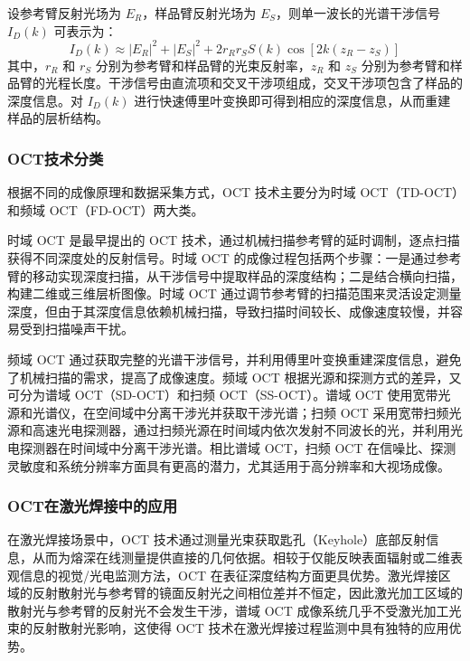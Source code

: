 设参考臂反射光场为 $E_R$，样品臂反射光场为 $E_S$，则单一波长的光谱干涉信号 $I_D(k)$ 可表示为：
\begin{equation}
I_D(k) \approx |E_R|^2 + |E_S|^2 + 2r_R r_S S(k) \cos[2k(z_R - z_S)]
\label{eq:oct_interference}
\end{equation}
其中，$r_R$ 和 $r_S$ 分别为参考臂和样品臂的光束反射率，$z_R$ 和 $z_S$ 分别为参考臂和样品臂的光程长度。干涉信号由直流项和交叉干涉项组成，交叉干涉项包含了样品的深度信息。对 $I_D(k)$ 进行快速傅里叶变换即可得到相应的深度信息，从而重建样品的层析结构。

\subsubsection{OCT技术分类}

根据不同的成像原理和数据采集方式，OCT 技术主要分为时域 OCT（TD-OCT）和频域 OCT（FD-OCT）两大类。

时域 OCT 是最早提出的 OCT 技术，通过机械扫描参考臂的延时调制，逐点扫描获得不同深度处的反射信号。时域 OCT 的成像过程包括两个步骤：一是通过参考臂的移动实现深度扫描，从干涉信号中提取样品的深度结构；二是结合横向扫描，构建二维或三维层析图像。时域 OCT 通过调节参考臂的扫描范围来灵活设定测量深度，但由于其深度信息依赖机械扫描，导致扫描时间较长、成像速度较慢，并容易受到扫描噪声干扰。

频域 OCT 通过获取完整的光谱干涉信号，并利用傅里叶变换重建深度信息，避免了机械扫描的需求，提高了成像速度。频域 OCT 根据光源和探测方式的差异，又可分为谱域 OCT（SD-OCT）和扫频 OCT（SS-OCT）。谱域 OCT 使用宽带光源和光谱仪，在空间域中分离干涉光并获取干涉光谱；扫频 OCT 采用宽带扫频光源和高速光电探测器，通过扫频光源在时间域内依次发射不同波长的光，并利用光电探测器在时间域中分离干涉光谱。相比谱域 OCT，扫频 OCT 在信噪比、探测灵敏度和系统分辨率方面具有更高的潜力，尤其适用于高分辨率和大视场成像。

\subsubsection{OCT在激光焊接中的应用}

在激光焊接场景中，OCT 技术通过测量光束获取匙孔（Keyhole）底部反射信息，从而为熔深在线测量提供直接的几何依据。相较于仅能反映表面辐射或二维表观信息的视觉/光电监测方法，OCT 在表征深度结构方面更具优势。激光焊接区域的反射散射光与参考臂的镜面反射光之间相位差并不恒定，因此激光加工区域的散射光与参考臂的反射光不会发生干涉，谱域 OCT 成像系统几乎不受激光加工光束的反射散射光影响，这使得 OCT 技术在激光焊接过程监测中具有独特的应用优势。

